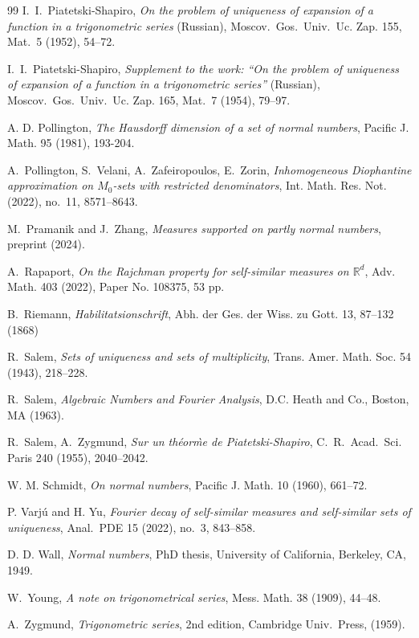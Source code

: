 \documentclass[12pt, twoside]{article}
\theoremstyle{definition}
\numberwithin{equation}{section}
\begin{document}
\begin{thebibliography}{99}
I.~I.~Piatetski-Shapiro,
{\em{On the problem of uniqueness of expansion of a function in a trigonometric series}} (Russian), 
Moscov.~Gos.~Univ.~Uc. Zap. 155, Mat.~5 (1952), 54--72. 

I.~I.~Piatetski-Shapiro,
{\em{Supplement to the work: ``On the problem of uniqueness of expansion of a function in a trigonometric series''}} (Russian), 
Moscov.~Gos.~Univ.~Uc. Zap. 165, Mat.~7 (1954), 79--97. 

A. D. Pollington,
{\em{The Hausdorff dimension of a set of normal numbers}},
Pacific J. Math. 95 (1981), 193-204.

A.~Pollington, S.~Velani, A.~Zafeiropoulos, E.~Zorin, 
{\em{Inhomogeneous Diophantine approximation on $M_0$-sets with restricted denominators}}, 
Int. Math. Res. Not. (2022), no.~11, 8571--8643. 

M.~Pramanik and J.~Zhang, 
{\em{Measures supported on partly normal numbers}}, preprint (2024).  

A.~Rapaport, 
{\em{On the Rajchman property for self-similar measures on $\mathbb R^d$}}, 
Adv. Math. 403 (2022), Paper No. 108375, 53 pp.

B.~Riemann, 
{\em{Habilitatsionschrift}}, 
Abh. der Ges. der Wiss. zu Gott. 13, 87–132 (1868)

R.~Salem, 
{\em{Sets of uniqueness and sets of multiplicity}}, 
Trans. Amer. Math. Soc. 54 (1943), 218–228. 

R.~Salem, 
{\em{Algebraic Numbers and Fourier Analysis}}, D.C. Heath and
Co., Boston, MA (1963).

R.~Salem, A.~Zygmund, 
{\em{Sur un th\'eor\`me de Piatetski-Shapiro}}, 
C.~R.~Acad.~Sci. Paris 240 (1955), 2040--2042.

W. M. Schmidt, 
{\em{On normal numbers}},
Pacific J. Math. 10 (1960), 661--72.

P. Varj\'u and H. Yu, 
{\em{Fourier decay of self-similar measures and self-similar sets of uniqueness}}, 
Anal.~PDE 15 (2022), no.~3, 843--858.

D. D. Wall, 
{\em{Normal numbers}}, 
PhD thesis, University of California, Berkeley, CA, 1949. 

W.~Young, 
{\em{A note on trigonometrical series}}, 
Mess. Math. 38 (1909), 44--48. 


A.~Zygmund, 
{\em{Trigonometric series}}, 2nd edition, 
Cambridge Univ.~Press, (1959).

\end{thebibliography}

\Addresses
\end{document}
